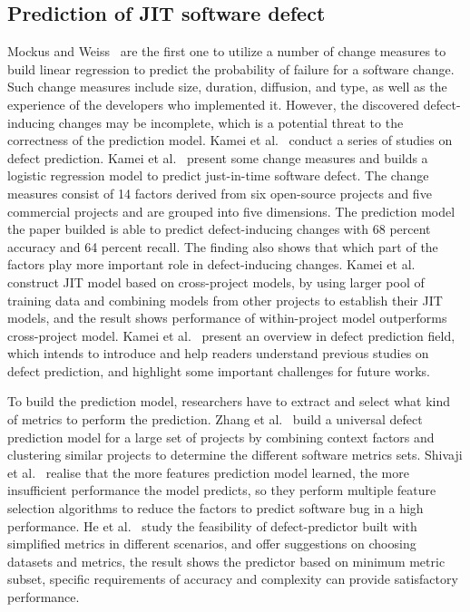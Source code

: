 \subsection{Prediction of JIT software defect}
Mockus and Weiss~\cite{mockus2000predicting} are the first one to utilize a number of change measures to build linear regression to predict the probability of failure for a software change. Such change measures include size, duration, diffusion, and type, as well as the experience of the developers who implemented it. However, the discovered defect-inducing changes may be incomplete, which is a potential threat to the correctness of the prediction model. Kamei et al.~\cite{Kamei2013TSE,kamei2016studying,kamei2016defect} conduct a series of studies on defect prediction. Kamei et al.~\cite{Kamei2013TSE} present some change measures and builds a logistic regression model to predict just-in-time software defect. The change measures consist of 14 factors derived from six open-source projects and five commercial projects and are grouped into five dimensions. The prediction model the paper builded is able to predict defect-inducing changes with 68 percent accuracy and 64 percent recall. The finding also shows that which part of the factors play more important role in defect-inducing changes. Kamei et al.~\cite{kamei2016studying} construct JIT model based on cross-project models, by using larger pool of training data and combining models from other projects to establish their JIT models, and the result shows performance of within-project model outperforms cross-project model. Kamei et al.~\cite{kamei2016defect} present an overview in defect prediction field, which intends to introduce and help readers understand previous studies on defect prediction, and highlight some important challenges for future works.

To build the prediction model, researchers have to extract and select what kind of metrics to perform the prediction. Zhang et al.~\cite{Zhang:2014:TBU} build a universal defect prediction model for a large set of projects by combining context factors and clustering similar projects to determine the different software metrics sets. Shivaji et al.~\cite{Shivaji2013TSE} realise that the more features prediction model learned, the more insufficient performance the model predicts, so they perform multiple feature selection algorithms to reduce the factors to predict software bug in a high performance. He et al.~\cite{he2015empirical} study the feasibility of defect-predictor built with simplified metrics in different scenarios, and offer suggestions on choosing datasets and metrics, the result shows the predictor based on minimum metric subset, specific requirements of accuracy and complexity can provide satisfactory performance.

